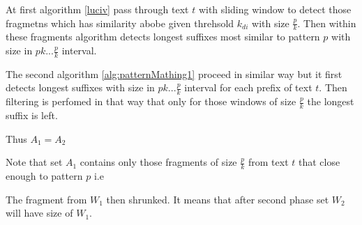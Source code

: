 At first algorithm \ref{luciv} pass through text $t$ with sliding window to detect those fragmetns which has similarity abobe given threhsold $k_{di}$ with size $\frac{p}{k}$.
Then within these fragments algorithm detects longest suffixes most similar to pattern $p$ with size in  $pk...\frac{p}{k}$ interval.

The second algorithm \ref{alg:patternMathing1} proceed in similar way but it first detects longest suffixes with size in $pk...\frac{p}{k}$ interval for each prefix of text $t$.
Then filtering is perfomed in that way that only for those windows of size $\frac{p}{k}$ the longest suffix is left.

Thus $A_1=A_2$  



  

Note that set $A_{1}$ contains only those fragments of size $\frac{p}{k}$ from text $t$ that close enough to pattern $p$ i.e 

The fragment from $W_{1}$ then shrunked.
It means that after second phase set $W_{2}$ will have size  of $W_{1}$. 
